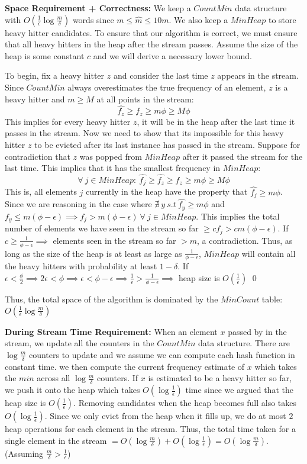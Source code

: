 \documentclass[12pt]{article}
\begin{document}
\begin{solution}
\textbf{Space Requirement + Correctness:} We keep a $CountMin$ data structure with $O(\frac{1}{\epsilon}\log{\frac{m}{\delta}})$ words since $m \leq \hat{m} \leq 10m$. We also keep a $MinHeap$ to store heavy hitter candidates. To ensure that our algorithm is correct, we must ensure that all heavy hitters in the heap after the stream passes. Assume the size of the heap is some constant $c$ and we will derive a necessary lower bound. 

To begin, fix a heavy hitter $z$ and consider the last time $z$ appears in the stream. Since $CountMin$ always overestimates the true frequency of an element, $z$ is a heavy hitter and $m \geq M$ at all points in the stream:
\[
\hat{f_z} \geq f_z \geq m\phi \geq M\phi
\]
This implies for every heavy hitter $z$, it will be in the heap after the last time it passes in the stream. Now we need to show that its impossible for this heavy hitter $z$ to be evicted after its last instance has passed in the stream. Suppose for contradiction that $z$ was popped from $MinHeap$ after it passed the stream for the last time. This implies that it has the smallest frequency in $MinHeap$:
\[
\forall~j\in MinHeap:~\hat{f_j} \geq \hat{f_z} \geq f_z \geq m\phi \geq M\phi
\]
This is, all elements $j$ currently in the heap have the property that $\hat{f_j} \geq m\phi$. Since we are reasoning in the case where $\nexists ~y~s.t~\hat{f_y} \geq m\phi$ and $f_y \leq m(\phi-\epsilon) \implies f_j >m(\phi-\epsilon)~\forall~j\in MinHeap$. This implies the total number of elements we have seen in the stream so far $\geq cf_j > cm(\phi-\epsilon)$. If $c \geq \frac{1}{\phi -\epsilon} \implies $ elements seen in the stream so far $>m$, a contradiction. Thus, as long as the size of the heap is at least as large as $\frac{1}{\phi -\epsilon}$, $MinHeap$ will contain all the heavy hitters with probability at least $1-\delta$. If $\epsilon < \frac{\phi}{2} \implies 2\epsilon < \phi \implies \epsilon < \phi - \epsilon \implies \frac{1}{\epsilon} > \frac{1}{\phi -\epsilon} \implies$ heap size is $O(\frac{1}{\epsilon})$ \qed

Thus, the total space of the algorithm is dominated by the $MinCount$ table: $O(\frac{1}{\epsilon}\log{\frac{m}{\delta}})$

\textbf{During Stream Time Requirement:} When an element $x$ passed by in the stream, we update all the counters in the $CountMin$ data structure. There are $\log{\frac{m}{\delta}}$ counters to update and we assume we can compute each hash function in constant time. we then compute the current frequency estimate of $x$ which takes the $min$ across all $\log{\frac{m}{\delta}}$ counters. If $x$ is estimated to be a heavy hitter so far, we push it onto the heap which takes $O(\log{\frac{1}{\epsilon}})$ time since we argued that the heap size is $O(\frac{1}{\epsilon})$. Removing candidates when the heap becomes full also takes $O(\log{\frac{1}{\epsilon}})$. Since we only evict from the heap when it fills up, we do at most $2$ heap operations for each element in the stream. Thus, the total time taken for a single element in the stream $=O(\log{\frac{m}{\delta}}) + O(\log{\frac{1}{\epsilon}}) = O(\log{\frac{m}{\delta}})$. (Assuming $\frac{m}{\delta} > \frac{1}{\epsilon}$)


\end{solution}
\end{document}
